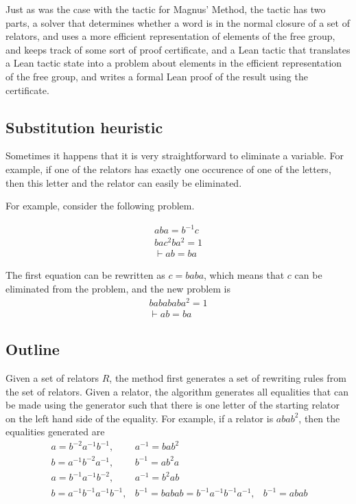 \documentclass[12pt]{article} %
\theoremstyle{definition}
\theoremstyle{definition}
\theoremstyle{definition}
\theoremstyle{definition}
\theoremstyle{definition}
\theoremstyle{definition}
\begin{document}
  Just as was the case with the tactic for Magnus' Method, the tactic has two parts,
  a solver that determines whether a word is in the normal closure of a set of relators,
  and uses a more efficient representation of elements of the free group, and keeps track
  of some sort of proof certificate, and a Lean tactic that translates a Lean tactic state
  into a problem about elements in the efficient representation of the free group, and
  writes a formal Lean proof of the result using the certificate.

\subsection{Substitution heuristic}\label{subst}
  Sometimes it happens that it is very straightforward to eliminate a variable.
  For example, if one of the relators has exactly one occurence of one of the
  letters, then this letter and the relator can easily be eliminated.

  For example, consider the following problem.

  \begin{equation}
    \begin{aligned}
      aba =b^{-1}c \\
      bac^2ba^2 = 1 \\
      \vdash ab=ba
    \end{aligned}
  \end{equation}

The first equation can be rewritten as $c = baba$, which means that $c$ can be eliminated
from the problem, and the new problem is
\begin{equation}
  \begin{aligned}
    babababa^2 = 1 \\
    \vdash ab=ba
  \end{aligned}
\end{equation}

\subsection{Outline}

  Given a set of relators $R$, the method first generates a set of rewriting rules
  from the set of relators. Given a relator, the algorithm generates all equalities
  that can be made using the generator such that there is one letter of the starting
  relator on the left hand side of the equality.
  For example, if a relator is $abab^2$, then the equalities generated are
  \begin{equation}\
    \begin{aligned}
      a = b^{-2}a^{-1}b^{-1}, & a^{-1} = bab^2 \\
      b = a^{-1}b^{-2}a^{-1}, & b^{-1} = ab^2a \\
      a=b^{-1}a^{-1}b^{-2}, & a^{-1}=b^2ab \\
      b=a^{-1}b^{-1}a^{-1}b^{-1}, & b^{-1} = baba
      b=b^{-1}a^{-1}b^{-1}a^{-1},& b^{-1} = abab
    \end{aligned}
  \end{equation}
\end{document}

